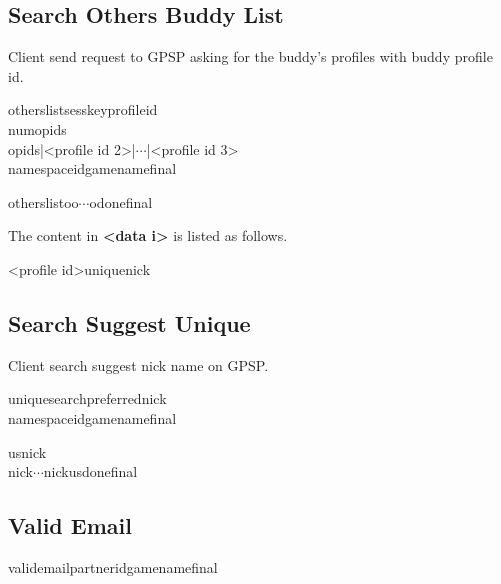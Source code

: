 \documentclass[oneside,titlepage,a4paper]{Definition/retrospy} %
\begin{document}
\subsection{Search Others Buddy List}
Client send request to GPSP asking for the buddy's profiles with buddy profile id.
\ClientRequest

\begin{mybox}
	\tbs otherslist\tbs\tbs sesskey\tbs <session key>\tbs profileid\tbs<profile id>\\
	\tbs numopids\tbs<number of recieved buddy profiles>\\
	\tbs opids\tbs <profile id 1>|<profile id 2>|$\cdots$|<profile id 3>\\
	\tbs namespaceid\tbs <namespace id>\tbs gamename\tbs <game name>\tbs final\tbs
\end{mybox}
\ServerResponse

\begin{mybox}
	\tbs otherslist\tbs\tbs o\tbs<data 1>\tbs o\tbs<data 2>\tbs $\cdots$\tbs <data n>\tbs odone\tbs final\tbs
\end{mybox}
The content in \textbf{<data i>} is listed as follows.
\begin{mybox}
	<profile id>\tbs uniquenick\tbs <unique nick>
\end{mybox}



\subsection{Search Suggest Unique}

Client search suggest nick name on GPSP.

\ClientRequest
\begin{mybox}
	\tbs uniquesearch\tbs\tbs preferrednick\tbs<unique nick name>\\
	\tbs namespaceid\tbs<namespace id>\tbs gamename\tbs<game name>\tbs final\tbs
\end{mybox}
\ServerResponse
\begin{mybox}
	\tbs us\tbs<number of suggest nick>\tbs nick\tbs <nick name1>\\
	\tbs nick\tbs<nick name2>\tbs $\cdots$\tbs nick\tbs <nick name n>\tbs usdone\tbs final\tbs
\end{mybox}


\subsection{Valid Email}
\ClientRequest
\begin{mybox}
	\tbs valid\tbs\tbs email\tbs<email account>\tbs partnerid\tbs <partner id>\tbs gamename\tbs<game name>\tbs final\tbs
\end{mybox}
\end{document}
